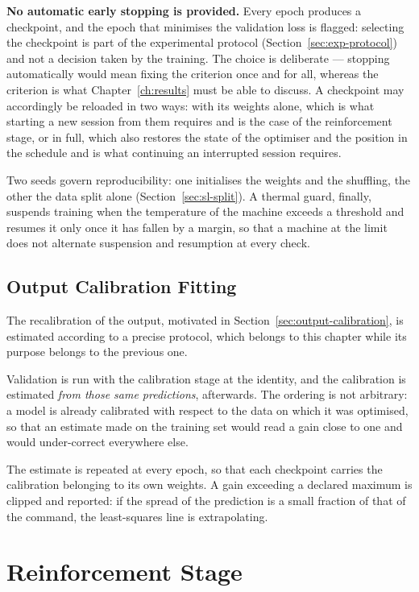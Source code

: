 \textbf{No automatic early stopping is provided.} Every epoch produces a
checkpoint, and the epoch that minimises the validation loss is flagged:
selecting the checkpoint is part of the experimental protocol
(Section~\ref{sec:exp-protocol}) and not a decision taken by the training. The
choice is deliberate --- stopping automatically would mean fixing the criterion
once and for all, whereas the criterion is what Chapter~\ref{ch:results} must be
able to discuss. A checkpoint may accordingly be reloaded in two ways: with its
weights alone, which is what starting a new session from them requires and is
the case of the reinforcement stage, or in full, which also restores the state
of the optimiser and the position in the schedule and is what continuing an
interrupted session requires.

Two seeds govern reproducibility: one initialises the weights and the shuffling,
the other the data split alone (Section~\ref{sec:sl-split}). A thermal guard,
finally, suspends training when the temperature of the machine exceeds a
threshold and resumes it only once it has fallen by a margin, so that a machine
at the limit does not alternate suspension and resumption at every check.

\subsection{Output Calibration Fitting}
\label{sec:sl-calibration}

The recalibration of the output, motivated in
Section~\ref{sec:output-calibration}, is estimated according to a precise
protocol, which belongs to this chapter while its purpose belongs to the
previous one.

Validation is run with the calibration stage at the identity, and the
calibration is estimated \emph{from those same predictions}, afterwards. The
ordering is not arbitrary: a model is already calibrated with respect to the
data on which it was optimised, so that an estimate made on the training set
would read a gain close to one and would under-correct everywhere else.

The estimate is repeated at every epoch, so that each checkpoint carries the
calibration belonging to its own weights. A gain exceeding a declared maximum is
clipped and reported: if the spread of the prediction is a small fraction of
that of the command, the least-squares line is extrapolating.

\section{Reinforcement Stage}
\label{sec:training-rl}

